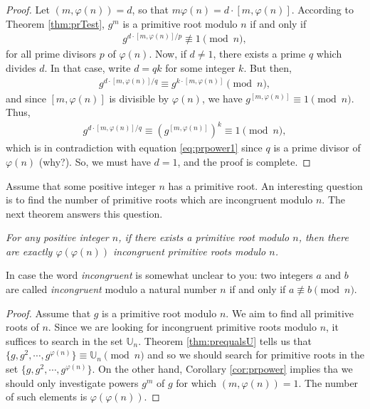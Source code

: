 \documentclass{subfile}
\begin{document}
	\begin{proof}
		Let $(m,\varphi(n))=d$, so that $m\varphi(n)=d\cdot [m,\varphi(n)]$. According to Theorem \ref{thm:prTest}, $g^m$ is a primitive root modulo $n$ if and only if
			\begin{align}\label{eq:prpower1}
			g^{{d\cdot [m,\varphi(n)]}/{p}}\not\equiv1\pmod n,
			\end{align}
		for all prime divisors $p$ of $\varphi(n)$. Now, if $d \neq 1$, there exists a prime $q$ which divides $d$. In that case, write $d=qk$ for some integer $k$. But then,
			\begin{align*}
				g^{{d\cdot [m,\varphi(n)]}/{q}} \equiv g^{k \cdot [m,\varphi(n)]}\pmod n,
			\end{align*}
		and since $[m,\varphi(n)]$ is divisible by $\varphi(n)$, we have $g^{ [m,\varphi(n)]} \equiv 1\pmod n$. Thus,
			\begin{align*}
			g^{{d\cdot [m,\varphi(n)]}/{q}} \equiv \left(g^{[m,\varphi(n)]}\right)^k \equiv 1\pmod n,
			\end{align*}
		which is in contradiction with equation \eqref{eq:prpower1} since $q$ is a prime divisor of $\varphi(n)$ (why?). So, we must have $d=1$, and the proof is complete.
	\end{proof}
	
Assume that some positive integer $n$ has a primitive root. An interesting question is to find the number of primitive roots which are incongruent modulo $n$. The next theorem answers this question.

	\begin{theorem}\slshape\label{thm:npr}
		For any positive integer $n$, if there exists a primitive root modulo $n$, then there are exactly $\varphi(\varphi(n))$ incongruent primitive roots modulo $n$.
	\end{theorem}

	\begin{note}
		In case the word \textit{incongruent} is somewhat unclear to you: two integers $a$ and $b$ are called \textit{incongruent} modulo a natural number $n$ if and only if $a \not \equiv b \pmod n$.
	\end{note}
	
	\begin{proof}
		Assume that $g$ is a primitive root modulo $n$. We aim to find all primitive roots of $n$. Since we are looking for incongruent primitive roots modulo $n$, it suffices to search in the set $\mathbb U_n$. Theorem \ref{thm:prequalsU} tells us that $\{g,g^2,\cdots,g^{\varphi(n)}\} \equiv \mathbb U_n \pmod n$ and so we should search for primitive roots in the set $\{g,g^2,\cdots,g^{\varphi(n)}\}$. On the other hand, Corollary \ref{cor:prpower} implies tha we should only investigate powers $g^m$ of $g$ for which $(m, \varphi(n))=1$. The number of such elements is $\varphi(\varphi(n))$.
	\end{proof}
	
\end{document}
